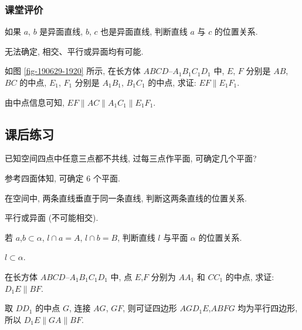 \subsubsection{课堂评价}
\begin{exercise}
    如果 $a$, $b$ 是异面直线, $b$, $c$ 也是异面直线, 判断直线 $a$ 与 $c$ 的位置关系.
\end{exercise}
\beginsolution
    无法确定, 相交、平行或异面均有可能.
\endsolution

\begin{exercise}
    如图 \ref{fig-190629-1920} 所示, 在长方体 $ABCD\text{--}A_1 B_1 C_1 D_1$ 中, $E$, $F$ 分别是 $AB$, $BC$ 的中点, $E_1$, $F_1$ 分别是 $A_1B_1$, $B_1C_1$ 的中点, 求证: $EF\parallel E_1 F_1$.
\end{exercise}
\beginsolution
    由中点信息可知, $EF\parallel AC\parallel A_1C_1\parallel E_1F_1$.
\endsolution

\subsection{课后练习}
\begin{exercise}
    已知空间四点中任意三点都不共线, 过每三点作平面, 可确定几个平面?
\end{exercise}
\beginsolution
    参考四面体知, 可确定 $6$ 个平面.
\endsolution

\begin{exercise}
    在空间中, 两条直线垂直于同一条直线, 判断这两条直线的位置关系.
\end{exercise}
\beginsolution
    平行或异面 (不可能相交).
\endsolution

\begin{exercise}
    若 $a$,$b\subset\alpha$, $l\cap a=A$, $l\cap b=B$, 判断直线 $l$ 与平面 $\alpha$ 的位置关系.
\end{exercise}
\beginsolution
    $l\subset \alpha$.
\endsolution

\begin{exercise}
    在长方体 $ABCD\text{--}A_1B_1C_1D_1$ 中, 点 $E$,$F$ 分别为 $AA_1$ 和 $CC_1$ 的中点, 求证: $D_1E\parallel BF$.
\end{exercise}
\beginsolution
    取 $DD_1$ 的中点 $G$, 连接 $AG$, $GF$, 
    则可证四边形 $AGD_1E$,$ABFG$ 均为平行四边形, 所以 $D_1E\parallel GA\parallel BF$.
\endsolution

